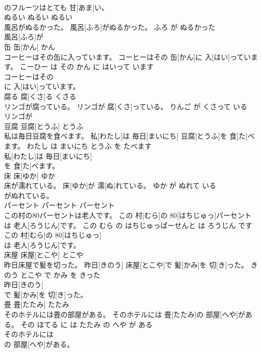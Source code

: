 \documentclass[8pt]{extreport}
\begin{document}
\begin{CJK}{UTF8}{min}
\\	のフルーツはとても 甘[あま]い。		
\\	ぬるい	ぬるい	ぬるい	
\\	風呂がぬるかった。	風呂[ふろ]がぬるかった。	ふろ が ぬるかった	
\\	風呂[ふろ]が
\\	缶	缶[かん]	かん	
\\	コーヒーはその缶に入っています。	コーヒーはその 缶[かん]に 入[はい]っています。	こーひー は その かん に はいって います	
\\	コーヒーはその
\\	に 入[はい]っています。		
\\	腐る	腐[くさ]る	くさる	
\\	リンゴが腐っている。	リンゴが 腐[くさ]っている。	りんご が くさって いる	
\\	リンゴが
\\	豆腐	豆腐[とうふ]	とうふ	
\\	私は毎日豆腐を食べます。	私[わたし]は 毎日[まいにち] 豆腐[とうふ]を 食[た]べます。	わたし は まいにち とうふ を たべます	
\\	私[わたし]は 毎日[まいにち]
\\	を 食[た]べます。		
\\	床	床[ゆか]	ゆか	
\\	床が濡れている。	床[ゆか]が 濡[ぬ]れている。	ゆか が ぬれて いる	
\\	がぬれている。		
\\	パーセント	パーセント	パーセント	
\\	この村の80パーセントは老人です。	この 村[むら]の 80[はちじゅっ]パーセントは 老人[ろうじん]です。	この むら の はちじゅっぱーせんと は ろうじん です	
\\	この 村[むら]の 80[はちじゅっ]
\\	は 老人[ろうじん]です。		
\\	床屋	床屋[とこや]	とこや	
\\	昨日床屋で髪を切った。	昨日[きのう] 床屋[とこや]で 髪[かみ]を 切[き]った。	きのう とこや で かみ を きった	
\\	昨日[きのう]
\\	で 髪[かみ]を 切[き]った。		
\\	畳	畳[たたみ]	たたみ	
\\	そのホテルには畳の部屋がある。	そのホテルには 畳[たたみ]の 部屋[へや]がある。	その ほてる に は たたみ の へや が ある	
\\	そのホテルには
\\	の 部屋[へや]がある。		

\end{CJK}
\end{document}

